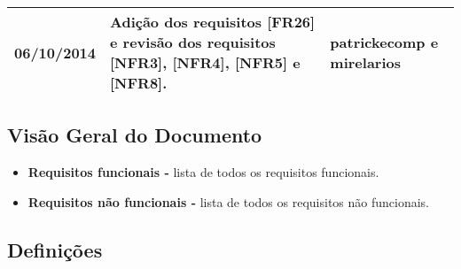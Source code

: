 \documentclass{article}
\begin{document}
\begin{table}[ht]
\begin{tabular}[pos]{|m{2cm} | m{7.2cm} | m{3.8cm}|}
          \small 06/10/2014 & \small Adição dos requisitos [FR26] e revisão dos requisitos [NFR3], [NFR4], [NFR5] e [NFR8].  & \small patrickecomp e mirelarios \\ \hline
	      
	    \end{tabular}
	  \end{table}
	
	\newpage
	
	\tableofcontents
	\newpage
	
	    
	
	\subsection{Visão Geral do Documento}
	  \begin{itemize}
	   \item \textbf{Requisitos funcionais -} lista de todos os requisitos funcionais.
	   \item \textbf{Requisitos não funcionais -} lista de todos os requisitos não funcionais.
	  \end{itemize}
	
	  \subsection{Definições}
	  
\end{document}
